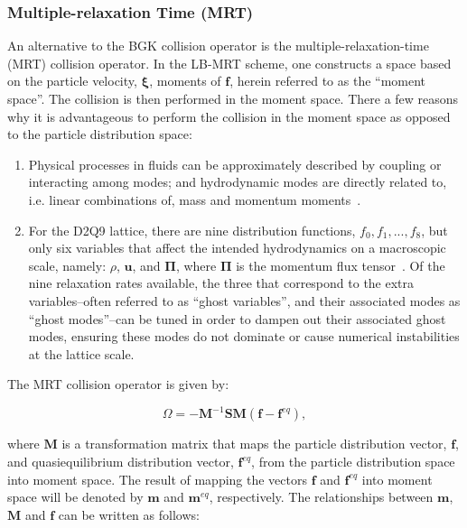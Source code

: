 \documentclass[pdftex,ms]{pittetd}
\newcommand{\pvel}{\boldsymbol{\xi}}
\newcommand{\colop}{\Omega}
\newcommand{\transM}{\mathbf{M}}
\newcommand{\relaxM}{\mathbf{S}}
\begin{document}
\subsubsection{Multiple-relaxation Time (MRT)}

An alternative to the BGK collision operator is the multiple-relaxation-time (MRT) collision operator.
In the LB-MRT scheme, one constructs a space based on the particle velocity, $\pvel$, moments of $\mathbf{f}$, herein referred to as the ``moment space''.
The collision is then performed in the moment space.
There a few reasons why it is advantageous to perform the collision in the moment space as opposed to the particle distribution space:
\begin{enumerate}
    \item Physical processes in fluids can be approximately described by coupling or interacting among modes; and hydrodynamic modes are directly related to, i.e. linear combinations of, mass and momentum moments~\cite{lallemand2000theory}.
    \item For the D2Q9 lattice, there are nine distribution functions, $f_0, f_1, ..., f_8$, but only six variables that affect the intended hydrodynamics on a macroscopic scale, namely: $\rho$, $\mathbf{u}$, and $\mathbf{\Pi}$, where $\mathbf{\Pi}$ is the momentum flux tensor~\cite{dellar2003incompressible}.
    Of the nine relaxation rates available, the three that correspond to the extra variables--often referred to as ``ghost variables'', and their associated modes as ``ghost modes''--can be tuned in order to dampen out their associated ghost modes, ensuring these modes do not dominate or cause numerical instabilities at the lattice scale.
\end{enumerate}

The MRT collision operator is given by:

\begin{equation} \label{eq:mrt-colop}
	\colop = - {\transM}^{-1} \relaxM \transM (\mathbf{f} - \mathbf{f}^{eq}),
\end{equation}

\noindent where $\transM$ is a transformation matrix that maps the particle distribution vector, $\mathbf{f}$, and quasiequilibrium distribution vector, $\mathbf{f}^{eq}$, from the particle distribution space into moment space.
The result of mapping the vectors $\mathbf{f}$ and $\mathbf{f}^{eq}$ into moment space will be denoted by $\mathbf{m}$ and $\mathbf{m}^{eq}$, respectively.
The relationships between $\mathbf{m}$, $\transM$ and $\mathbf{f}$ can be written as follows:
\end{document}
